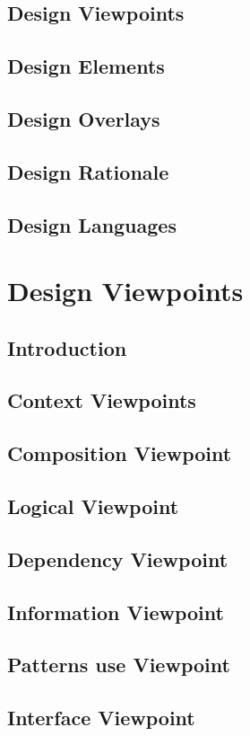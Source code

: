 \documentclass{article}
\begin{document}
\subsection{Design Viewpoints}
\subsection{Design Elements}
\subsection{Design Overlays}
\subsection{Design Rationale}
\subsection{Design Languages}

\section{Design Viewpoints}

\subsection{Introduction}
\subsection{Context Viewpoints}
\subsection{Composition Viewpoint}
\subsection{Logical Viewpoint}
\subsection{Dependency Viewpoint}
\subsection{Information Viewpoint}
\subsection{Patterns use Viewpoint}
\subsection{Interface Viewpoint}
\end{document}
